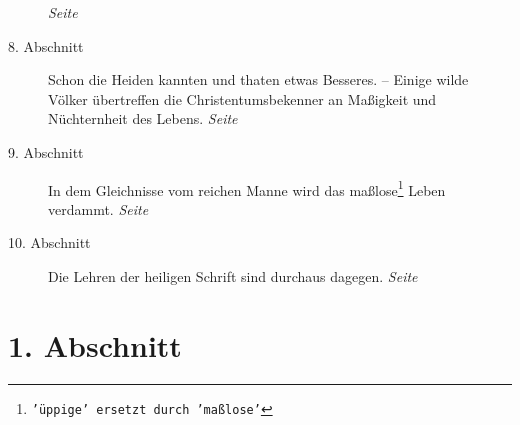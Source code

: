 \begin{description}
\dotfill \textit{Seite \pageref{kap14_ab7}}\\
\item[8. Abschnitt] Schon die Heiden kannten und thaten etwas Besseres. --
Einige wilde Völker übertreffen die Christentumsbekenner an Maßigkeit und
Nüchternheit des Lebens.
\dotfill \textit{Seite \pageref{kap14_ab8}}\\
\item[9. Abschnitt] In dem Gleichnisse vom reichen Manne wird das maßlose\footnote{\texttt{'üppige' ersetzt durch 'maßlose'}} Leben
verdammt.
\dotfill \textit{Seite \pageref{kap14_ab9}}\\
\item[10. Abschnitt] Die Lehren der heiligen Schrift sind durchaus dagegen.
\dotfill \textit{Seite \pageref{kap14_ab10}}\\
\end{description}

\newpage

\section{1. Abschnitt} \label{kap14_ab1}

